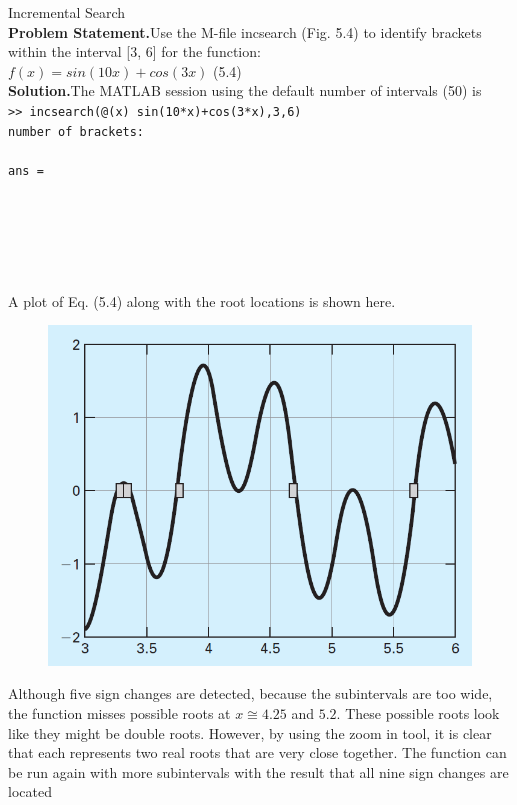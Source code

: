 \documentclass[../main.tex]{subfiles}
\begin{document}
\begin{example} Incremental Search\\

    \noindent\textbf{Problem Statement.}\quad Use the M-file incsearch (Fig. 5.4) to identify brackets within the
    interval [3, 6] for the function:\\

    $f(x) = sin(10x)+cos(3x)$
    \hfill (5.4)\\

    \noindent\textbf{Solution.}\quad The MATLAB session using the default number of intervals (50) is\\

    \noindent\texttt{>> incsearch(@(x) sin(10*x)+cos(3*x),3,6)\\
    number of brackets:\\
    \\
    \noindent ans =\\
     \\
     \\
     \\
     \\
     \\}

    \noindent A plot of Eq. (5.4) along with the root locations is shown here.
    \newpage

    \begin{figure}[h]
        \includegraphics[width=0.65\linewidth]{./images/example_5_2_1}
    \end{figure}

    \noindent Although five sign changes are detected, because the subintervals are too wide, the function
    misses possible roots at $x\cong 4.25$ and $5.2$. These possible roots look like they might be
    double roots. However, by using the zoom in tool, it is clear that each represents two real
    roots that are very close together. The function can be run again with more subintervals
    with the result that all nine sign changes are located\\


\end{example}
\end{document}
